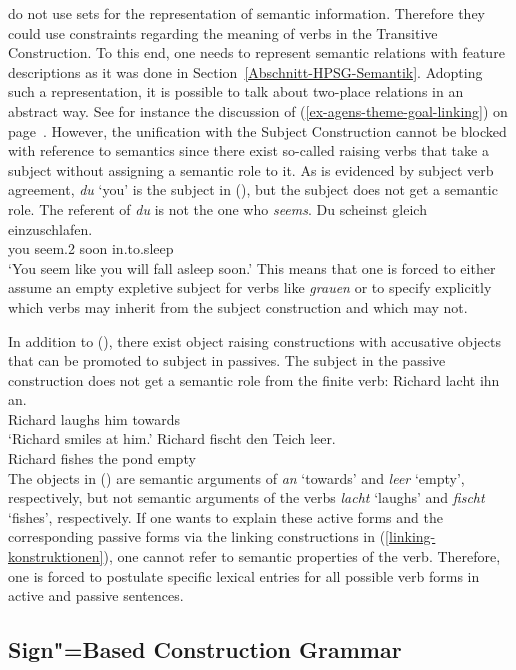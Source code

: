 \citet{MR2001a} do not use sets for the representation of semantic information. Therefore they could
use constraints regarding the meaning of verbs in the Transitive Construction. To this end, one needs
to represent semantic relations with feature descriptions as it was done in
Section~\ref{Abschnitt-HPSG-Semantik}. Adopting such a representation, it is possible to talk about
two-place relations in an abstract way. See for instance the discussion of
(\ref{ex-agens-theme-goal-linking}) on page~\pageref{ex-agens-theme-goal-linking}.
However, the unification with the Subject Construction cannot be blocked with reference to
semantics since there exist so-called raising verbs that take a subject without assigning a semantic role to it.
As is evidenced by subject verb agreement, \emph{du} `you' is the subject in (), but the
subject does not get a semantic role. The referent of \emph{du} is not the one who \emph{seems}.
\ea
\gll Du scheinst gleich einzuschlafen.\\
     you seem.2\SG{} soon in.to.sleep\\
\glt `You seem like you will fall asleep soon.'
\z
\largerpage[-1]
This means that one is forced to either assume an empty expletive subject for verbs like
\emph{grauen} or to specify explicitly which verbs may inherit from the subject construction and
which may not.

In addition to (), there exist object raising constructions with accusative objects that can
be promoted to subject in passives. The subject in the passive construction does not get a semantic
role from the finite verb:
\eal
\ex
\gll Richard lacht ihn an.\\
     Richard laughs him towards\\
\glt `Richard smiles at him.'
\ex
\gll Richard fischt den Teich leer.\\
     Richard fishes the pond empty\\
\zl
The objects in () are semantic arguments of \emph{an} `towards' and \emph{leer} `empty', respectively, but not
semantic arguments of the verbs \emph{lacht} `laughs' and \emph{fischt} `fishes', respectively.
If one wants to explain these active forms and the corresponding passive forms via the linking
constructions in (\ref{linking-konstruktionen}), one cannot refer to semantic properties of the
verb. Therefore, one is forced to postulate specific lexical entries for all possible verb forms in
active and passive sentences.


\subsection{Sign"=Based Construction Grammar}
\label{sec-SbCxG}\label{sec-sbcg}\label{sec-SBCG}

